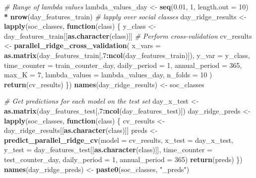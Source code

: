 \documentclass[
]{article}
\newenvironment{Shaded}{\begin{snugshade}}{\end{snugshade}}
\newcommand{\AttributeTok}[1]{\textcolor[rgb]{0.13,0.29,0.53}{#1}}
\newcommand{\CommentTok}[1]{\textcolor[rgb]{0.56,0.35,0.01}{\textit{#1}}}
\newcommand{\ControlFlowTok}[1]{\textcolor[rgb]{0.13,0.29,0.53}{\textbf{#1}}}
\newcommand{\DecValTok}[1]{\textcolor[rgb]{0.00,0.00,0.81}{#1}}
\newcommand{\FloatTok}[1]{\textcolor[rgb]{0.00,0.00,0.81}{#1}}
\newcommand{\FunctionTok}[1]{\textcolor[rgb]{0.13,0.29,0.53}{\textbf{#1}}}
\newcommand{\NormalTok}[1]{#1}
\newcommand{\OtherTok}[1]{\textcolor[rgb]{0.56,0.35,0.01}{#1}}
\newcommand{\SpecialCharTok}[1]{\textcolor[rgb]{0.81,0.36,0.00}{\textbf{#1}}}
\newcommand{\StringTok}[1]{\textcolor[rgb]{0.31,0.60,0.02}{#1}}
\begin{document}
\begin{Shaded}
\begin{Highlighting}[]
\CommentTok{\# Range of lambda values}
\NormalTok{lambda\_values\_day }\OtherTok{\textless{}{-}} \FunctionTok{seq}\NormalTok{(}\FloatTok{0.01}\NormalTok{, }\DecValTok{1}\NormalTok{, }\AttributeTok{length.out =} \DecValTok{10}\NormalTok{) }\SpecialCharTok{*} \FunctionTok{nrow}\NormalTok{(day\_features\_train)}
\CommentTok{\# lapply over social classes}
\NormalTok{day\_ridge\_results }\OtherTok{\textless{}{-}} \FunctionTok{lapply}\NormalTok{(soc\_classes, }\ControlFlowTok{function}\NormalTok{(class) \{}
\NormalTok{  y\_class }\OtherTok{\textless{}{-}}\NormalTok{ day\_features\_train[[}\FunctionTok{as.character}\NormalTok{(class)]]}
  \CommentTok{\# Perform cross{-}validation}
\NormalTok{  cv\_results }\OtherTok{\textless{}{-}} \FunctionTok{parallel\_ridge\_cross\_validation}\NormalTok{(}
    \AttributeTok{x\_vars =} \FunctionTok{as.matrix}\NormalTok{(day\_features\_train[,}\DecValTok{7}\SpecialCharTok{:}\FunctionTok{ncol}\NormalTok{(day\_features\_train)]), }
    \AttributeTok{y\_var =}\NormalTok{ y\_class,}
    \AttributeTok{time\_counter =}\NormalTok{ train\_counter\_day, }
    \AttributeTok{daily\_period =} \DecValTok{1}\NormalTok{,}
    \AttributeTok{annual\_period =} \DecValTok{365}\NormalTok{,}
    \AttributeTok{max\_K =} \DecValTok{7}\NormalTok{,}
    \AttributeTok{lambda\_values =}\NormalTok{ lambda\_values\_day,}
    \AttributeTok{n\_folds =} \DecValTok{10}
\NormalTok{  )}
  \FunctionTok{return}\NormalTok{(cv\_results)}
\NormalTok{\})}
\FunctionTok{names}\NormalTok{(day\_ridge\_results) }\OtherTok{\textless{}{-}}\NormalTok{ soc\_classes}

\CommentTok{\# Get predictions for each model on the test set}
\NormalTok{day\_x\_test }\OtherTok{\textless{}{-}} \FunctionTok{as.matrix}\NormalTok{(day\_features\_test[,}\DecValTok{7}\SpecialCharTok{:}\FunctionTok{ncol}\NormalTok{(day\_features\_test)])}
\NormalTok{day\_ridge\_preds }\OtherTok{\textless{}{-}} \FunctionTok{lapply}\NormalTok{(soc\_classes, }\ControlFlowTok{function}\NormalTok{(class) \{}
\NormalTok{  cv\_results }\OtherTok{\textless{}{-}}\NormalTok{ day\_ridge\_results[[}\FunctionTok{as.character}\NormalTok{(class)]]}
\NormalTok{  preds }\OtherTok{\textless{}{-}} \FunctionTok{predict\_parallel\_ridge\_cv}\NormalTok{(}\AttributeTok{model =}\NormalTok{ cv\_results,}
                                     \AttributeTok{x\_test =}\NormalTok{ day\_x\_test,}
                                     \AttributeTok{y\_test =}\NormalTok{ day\_features\_test[[}\FunctionTok{as.character}\NormalTok{(class)]],}
                                     \AttributeTok{time\_counter =}\NormalTok{ test\_counter\_day,}
                                     \AttributeTok{daily\_period =} \DecValTok{1}\NormalTok{,}
                                     \AttributeTok{annual\_period =} \DecValTok{365}\NormalTok{)}
  \FunctionTok{return}\NormalTok{(preds)}
\NormalTok{\})}
\FunctionTok{names}\NormalTok{(day\_ridge\_preds) }\OtherTok{\textless{}{-}} \FunctionTok{paste0}\NormalTok{(soc\_classes, }\StringTok{"\_preds"}\NormalTok{)}
\end{Highlighting}
\end{Shaded}
\end{document}
